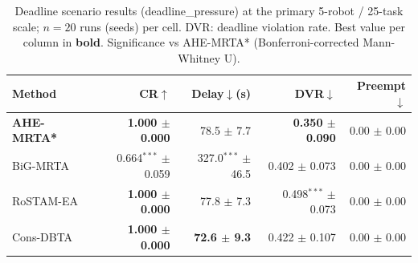 \begin{table}[t]
\centering
\caption{Deadline scenario results (deadline\_pressure) at the primary 5-robot / 25-task scale; $n{=}20$ runs (seeds) per cell. DVR: deadline violation rate. Best value per column in \textbf{bold}. Significance vs AHE-MRTA* (Bonferroni-corrected Mann-Whitney U).}
\label{tab:deadline}
\small
\setlength{\tabcolsep}{3pt}
\begin{tabular}{lrrrr}
\toprule
\textbf{Method} & \textbf{CR$\uparrow$} & \textbf{Delay$\downarrow$(s)} & \textbf{DVR$\downarrow$} & \textbf{Preempt$\downarrow$} \\
\midrule
\textbf{AHE-MRTA*} & \textbf{1.000 $\pm$ 0.000} & 78.5 $\pm$ 7.7 & \textbf{0.350 $\pm$ 0.090} & 0.00 $\pm$ 0.00 \\
BiG-MRTA & 0.664$^{***}$ $\pm$ 0.059 & 327.0$^{***}$ $\pm$ 46.5 & 0.402 $\pm$ 0.073 & 0.00 $\pm$ 0.00 \\
RoSTAM-EA & \textbf{1.000 $\pm$ 0.000} & 77.8 $\pm$ 7.3 & 0.498$^{***}$ $\pm$ 0.073 & 0.00 $\pm$ 0.00 \\
Cons-DBTA & \textbf{1.000 $\pm$ 0.000} & \textbf{72.6 $\pm$ 9.3} & 0.422 $\pm$ 0.107 & 0.00 $\pm$ 0.00 \\
\bottomrule
\end{tabular}
\end{table}
